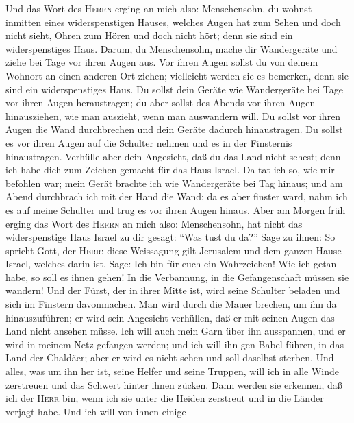  Und das Wort des \textsc{Herrn} erging an mich also:
 Menschensohn, du wohnst inmitten eines widerspenstigen
Hauses, welches Augen hat zum Sehen und doch nicht sieht, Ohren zum
Hören und doch nicht hört; denn sie sind ein widerspenstiges Haus.
 Darum, du Menschensohn, mache dir Wandergeräte und ziehe
bei Tage vor ihren Augen aus. Vor ihren Augen sollst du von deinem
Wohnort an einen anderen Ort ziehen; vielleicht werden sie es bemerken,
denn sie sind ein widerspenstiges Haus.  Du sollst dein
Geräte wie Wandergeräte bei Tage vor ihren Augen heraustragen; du aber
sollst des Abends vor ihren Augen hinausziehen, wie man auszieht, wenn
man auswandern will.  Du sollst vor ihren Augen die Wand
durchbrechen und dein Geräte dadurch hinaustragen.  Du
sollst es vor ihren Augen auf die Schulter nehmen und es in der
Finsternis hinaustragen. Verhülle aber dein Angesicht, daß du das Land
nicht sehest; denn ich habe dich zum Zeichen gemacht für das Haus
Israel.  Da tat ich so, wie mir befohlen war; mein Gerät
brachte ich wie Wandergeräte bei Tag hinaus; und am Abend durchbrach ich
mit der Hand die Wand; da es aber finster ward, nahm ich es auf meine
Schulter und trug es vor ihren Augen hinaus.  Aber am
Morgen früh erging das Wort des \textsc{Herrn} an mich also:
 Menschensohn, hat nicht das widerspenstige Haus Israel zu
dir gesagt:  ``Was tust du da?'' Sage zu ihnen: So
spricht Gott, der \textsc{Herr}: diese Weissagung gilt Jerusalem und dem
ganzen Hause Israel, welches darin ist.  Sage: Ich bin
für euch ein Wahrzeichen! Wie ich getan habe, so soll es ihnen gehen! In
die Verbannung, in die Gefangenschaft müssen sie wandern!
 Und der Fürst, der in ihrer Mitte ist, wird seine
Schulter beladen und sich im Finstern davonmachen. Man wird durch die
Mauer brechen, um ihn da hinauszuführen; er wird sein Angesicht
verhüllen, daß er mit seinen Augen das Land nicht ansehen müsse.
 Ich will auch mein Garn über ihn ausspannen, und er wird
in meinem Netz gefangen werden; und ich will ihn gen Babel führen, in
das Land der Chaldäer; aber er wird es nicht sehen und soll daselbst
sterben.  Und alles, was um ihn her ist, seine Helfer und
seine Truppen, will ich in alle Winde zerstreuen und das Schwert hinter
ihnen zücken.  Dann werden sie erkennen, daß ich der
\textsc{Herr} bin, wenn ich sie unter die Heiden zerstreut und in die
Länder verjagt habe.  Und ich will von ihnen einige
